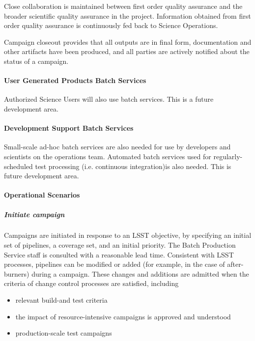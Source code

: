 Close collaboration is maintained between first order quality assurance and the
broader scientific quality assurance in the project. Information obtained from
first order quality assurance is continuously fed back to Science Operations.

Campaign closeout provides that all outputs are in final form, documentation and
other artifacts have been produced, and all parties are actively notified about
the status of a campaign.

\paragraph{User Generated Products Batch Services}
Authorized Science Users will also use batch services.   This is a future development area.
\paragraph{Development Support Batch Services}
Small-scale ad-hoc batch services are also needed for use by developers and scientists on the operations team.
Automated batch services used for regularly-scheduled test processing (i.e. continuous integration)is also needed.
This is future development area.



\paragraph{Operational Scenarios}

\subparagraph{Initiate campaign}

Campaigns are initiated in response to an LSST objective, by specifying an
initial set of pipelines, a coverage set, and an initial priority. The Batch
Production Service staff is consulted with a reasonable lead time. Consistent with
LSST processes, pipelines can be modified or added (for example, in the case of
after-burners) during a campaign. These changes and additions are admitted when
the criteria of change control processes are satisfied, including

\begin{itemize}

\item relevant build-and test criteria

\item the impact of resource-intensive campaigns is approved and understood

\item production-scale test campaigns

\end{itemize}

